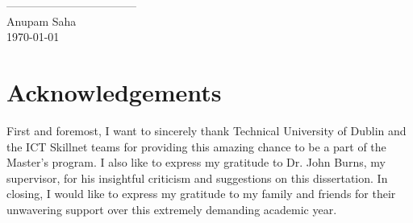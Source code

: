 \documentclass[12pt]{article}
\begin{document}
\vspace{2cm}
\begin{flushright}
-----------------------------------\\
Anupam Saha\\
\today
\end{flushright}
\pagebreak

\section*{Acknowledgements}
First and foremost, I want to sincerely thank Technical University of Dublin and the ICT Skillnet teams for providing this amazing chance to be a part of the Master's program. I also like to express my gratitude to Dr. John Burns, my supervisor, for his insightful criticism and suggestions on this dissertation. In closing, I would like to express my gratitude to my family and friends for their unwavering support over this extremely demanding academic year.
\pagebreak

\listoffigures
\pagebreak


\listoftables
\pagebreak



\printglossary[type=\acronymtype]
\pagebreak


\tableofcontents
\pagebreak



\pagebreak



\pagebreak



\pagebreak



\pagebreak



\pagebreak



\pagebreak



\pagebreak



\pagebreak


\printbibliography
\end{document}
